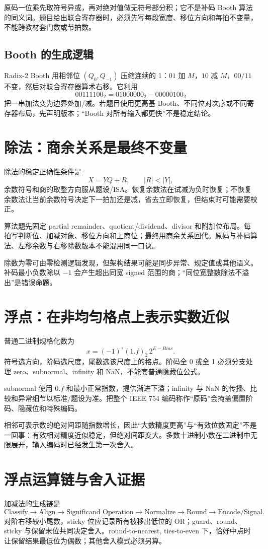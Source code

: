 \documentclass[UTF8,fontset=fandol,11pt,a4paper]{ctexart}
\begin{document}
原码一位乘先取符号异或，再对绝对值做无符号部分积；它不是补码 Booth 算法的同义词。题目给出联合寄存器时，必须先写每段宽度、移位方向和每拍不变量，不能跨教材套门数或节拍数。

\subsection{Booth 的生成逻辑}
Radix-2 Booth 用相邻位 $(Q_0,Q_{-1})$ 压缩连续的 1：$01$ 加 $M$，$10$ 减 $M$，$00/11$ 不变，然后对联合寄存器算术右移。它利用
\[
00111100_2=01000000_2-00000100_2
\]
把一串加法变为边界处加/减。若题目使用更高基 Booth、不同位对次序或不同寄存器布局，先声明版本；“Booth 对所有输入都更快”不是稳定结论。

\section{除法：商余关系是最终不变量}
除法的稳定正确性条件是
\[
X=YQ+R,\qquad |R|<|Y|,
\]
余数符号和商的取整方向服从题设/ISA。恢复余数法在试减为负时恢复；不恢复余数法让当前余数符号决定下一拍加还是减，省去立即恢复，但结束时可能需要校正。

算法题先固定 partial remainder、quotient/dividend、divisor 和附加位布局。每拍写判断位、加减对象、移位方向和上商位；最终用商余关系回代。原码与补码算法、左移余数与右移除数版本不能混用同一口诀。

除数为零可由零检测逻辑发现，但架构结果可能是同步异常、规定值或其他语义。补码最小负数除以 $-1$ 会产生超出同宽 signed 范围的商；“同位宽整数除法不溢出”是错误命题。

\section{浮点：在非均匀格点上表示实数近似}
普通二进制规格化数为
\[
x=(-1)^s(1.f)_2\,2^{E-Bias}.
\]
符号选方向，阶码选尺度，尾数选该尺度上的格点。阶码全 0 或全 1 必须分支处理 zero、subnormal、infinity 和 NaN，不能套普通隐藏位公式。

subnormal 使用 $0.f$ 和最小正常指数，提供渐进下溢；infinity 与 NaN 的传播、比较和异常细节以标准/题设为准。把整个 IEEE 754 编码称作“原码”会掩盖偏置阶码、隐藏位和特殊编码。

相邻可表示数的绝对间距随指数增长，因此“大数精度更高”与“有效位数固定”不是一回事：有效相对精度近似稳定，但绝对间距变大。多数十进制小数在二进制中无限展开，输入编码时已经发生第一次舍入。

\section{浮点运算链与舍入证据}
加减法的生成链是
\[
\text{Classify}\to\text{Align}\to\text{Significand Operation}\to\text{Normalize}\to\text{Round}\to\text{Encode/Signal}.
\]
对阶右移较小尾数，sticky 位应记录所有被移出低位的 OR；guard、round、sticky 与保留末位共同决定舍入。round-to-nearest, ties-to-even 下，恰好中点时让保留结果最低位为偶数；其他舍入模式必须另算。
\end{document}
